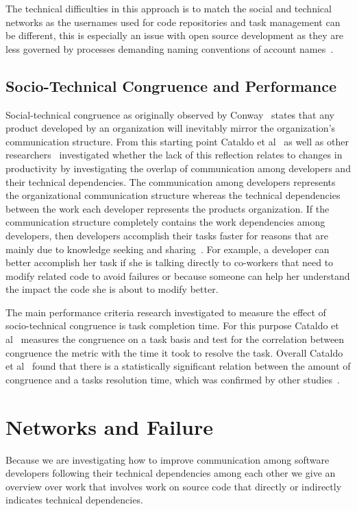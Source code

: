 The technical difficulties in this approach is to match the social and technical networks as the usernames used for code repositories and task management can be different, this is especially an issue with open source development as they are less governed by processes demanding naming conventions of account names~\cite{schroeter:isese:2006}.

\subsection{Socio-Technical Congruence and Performance}
Social-technical congruence as originally observed by Conway~\cite{conway:datamination:1968} states that any product developed by an organization will inevitably mirror the organization's communication structure.
From this starting point Cataldo et al~\cite{cataldo:cscw:2006} as well as other researchers~\cite{valetto:msr:2007,ducheneaut:cscw:2005,ehrlich:stc:2008} investigated whether the lack of this reflection relates to changes in productivity by investigating the overlap of communication among developers and their technical dependencies.
The communication among developers represents the organizational communication structure whereas the technical dependencies between the work each developer represents the products organization.
If the communication structure completely contains the work dependencies among developers, then developers accomplish their tasks faster for reasons that are mainly due to knowledge seeking and sharing~\cite{desouza2006:knowledge}.
For example, a developer can better accomplish her task if she is talking directly to co-workers that need to modify related code to avoid failures or because someone can help her understand the impact the code she is about to modify better.

The main performance criteria research investigated to measure the effect of socio-technical congruence is task completion time.
For this purpose Cataldo et al~\cite{cataldo:cscw:2006} measures the congruence on a task basis and test for the correlation between congruence the metric with the time it took to resolve the task.
Overall Cataldo et al~\cite{cataldo:cscw:2006} found that there is a statistically significant relation between the amount of congruence and a tasks resolution time, which was confirmed by other studies~\cite{valetto:msr:2007,ehrlich:stc:2008}.


\section{Networks and Failure}
Because we are investigating how to improve communication among software developers following their technical dependencies among each other we give an overview over work that involves work on source code that directly or indirectly indicates technical dependencies. 

